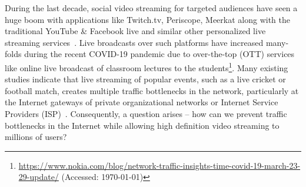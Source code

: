 During the last decade, social video streaming for targeted audiences have seen a huge boom with applications like Twitch.tv, Periscope, Meerkat along with the traditional YouTube \& Facebook live and similar other personalized live streaming services~\cite{wang2016anatomy}. Live broadcasts over such platforms have increased many-folds during the recent COVID-19 pandemic due to over-the-top (OTT) services like online live broadcast of classroom lectures to the students\footnote{\url{https://www.nokia.com/blog/network-traffic-insights-time-covid-19-march-23-29-update/} (Accessed: \today)}. Many existing studies indicate that live streaming of popular events, such as a live cricket or football match, creates multiple traffic bottlenecks in the network, particularly at the Internet gateways of private organizational networks or Internet Service Providers (ISP)~\cite{yan2018understanding}. Consequently, a question arises -- how can we prevent traffic bottlenecks in the Internet while allowing high definition video streaming to millions of users? 

